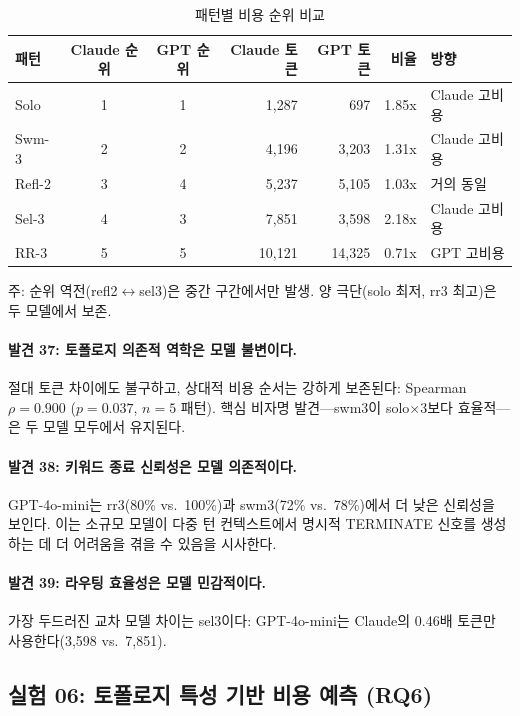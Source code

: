 \begin{table}[H]
\centering
\caption{패턴별 비용 순위 비교}
\label{tab:cross-model-rank}
{\small
\begin{tabular}{lccrrrl}
\toprule
패턴 & Claude 순위 & GPT 순위 & Claude 토큰 & GPT 토큰 & 비율 & 방향 \\
\midrule
Solo  & 1 & 1 & 1,287  & 697    & 1.85x & Claude 고비용 \\
Swm-3 & 2 & 2 & 4,196  & 3,203  & 1.31x & Claude 고비용 \\
Refl-2 & 3 & 4 & 5,237 & 5,105  & 1.03x & 거의 동일 \\
Sel-3 & 4 & 3 & 7,851  & 3,598  & 2.18x & Claude 고비용 \\
RR-3  & 5 & 5 & 10,121 & 14,325 & 0.71x & GPT 고비용 \\
\bottomrule
\end{tabular}
}

\smallskip
{\footnotesize 주: 순위 역전(refl2$\leftrightarrow$sel3)은 중간 구간에서만 발생. 양 극단(solo 최저, rr3 최고)은 두 모델에서 보존.}
\end{table}

\paragraph{발견 37: 토폴로지 의존적 역학은 모델 불변이다.}
절대 토큰 차이에도 불구하고, 상대적 비용 순서는 강하게 보존된다: Spearman $\rho = 0.900$ ($p = 0.037$, $n = 5$ 패턴). 핵심 비자명 발견---swm3이 solo$\times$3보다 효율적---은 두 모델 모두에서 유지된다.

\paragraph{발견 38: 키워드 종료 신뢰성은 모델 의존적이다.}
GPT-4o-mini는 rr3(80\% vs.\ 100\%)과 swm3(72\% vs.\ 78\%)에서 더 낮은 신뢰성을 보인다. 이는 소규모 모델이 다중 턴 컨텍스트에서 명시적 TERMINATE 신호를 생성하는 데 더 어려움을 겪을 수 있음을 시사한다.

\paragraph{발견 39: 라우팅 효율성은 모델 민감적이다.}
가장 두드러진 교차 모델 차이는 sel3이다: GPT-4o-mini는 Claude의 0.46배 토큰만 사용한다(3,598 vs.\ 7,851).

\subsection{실험 06: 토폴로지 특성 기반 비용 예측 (RQ6)}
\label{sec:exp06}

